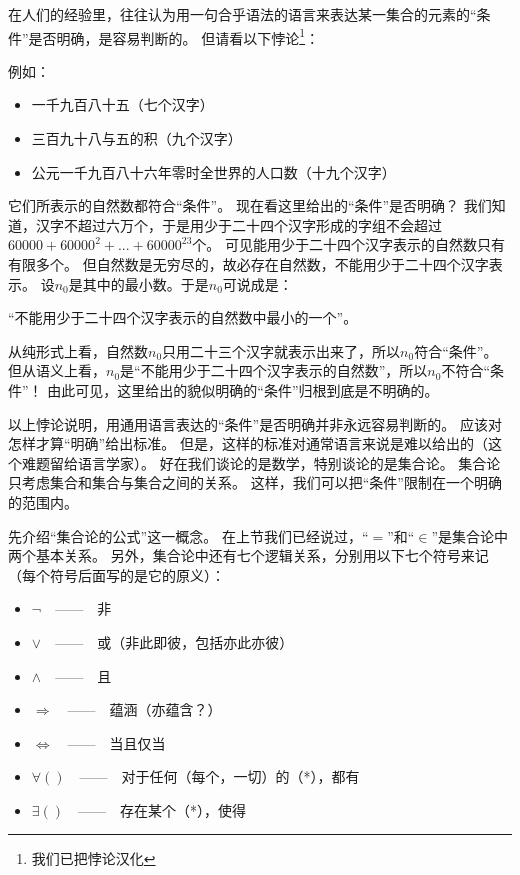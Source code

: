 在人们的经验里，往往认为用一句合乎语法的语言来表达某一集合的元素的“条件”是否明确，是容易判断的。
但请看以下悖论\footnote{我们已把悖论汉化}：


例如：
\begin{itemize}[label=$\circ$]
\item 一千九百八十五（七个汉字）
\item 三百九十八与五的积（九个汉字）
\item 公元一千九百八十六年零时全世界的人口数（十九个汉字）
\end{itemize}

\noindent 它们所表示的自然数都符合“条件”。
现在看这里给出的“条件”是否明确？
我们知道，汉字不超过六万个，于是用少于二十四个汉字形成的字组不会超过$60000+60000^{2} +...+60000^{23}$个。
可见能用少于二十四个汉字表示的自然数只有有限多个。
但自然数是无穷尽的，故必存在自然数，不能用少于二十四个汉字表示。
设$n_{0}$是其中的最小数。于是$n_{0}$可说成是：
\begin{center}
“不能用少于二十四个汉字表示的自然数中最小的一个”。
\end{center}
\noindent 从纯形式上看，自然数$n_{0}$只用二十三个汉字就表示出来了，所以$n_{0}$符合“条件”。
但从语义上看，$n_{0}$是“不能用少于二十四个汉字表示的自然数”，所以$n_{0}$不符合“条件”！
由此可见，这里给出的貌似明确的“条件”归根到底是不明确的。

以上悖论说明，用通用语言表达的“条件”是否明确并非永远容易判断的。
应该对怎样才算“明确”给出标准。
但是，这样的标准对通常语言来说是难以给出的（这个难题留给语言学家）。
好在我们谈论的是数学，特别谈论的是集合论。
集合论只考虑集合和集合与集合之间的关系。
这样，我们可以把“条件”限制在一个明确的范围内。

先介绍“集合论的公式”这一概念。
在上节我们已经说过，“$=$”和“$\in$”是集合论中两个基本关系。
另外，集合论中还有七个逻辑关系，分别用以下七个符号来记（每个符号后面写的是它的原义）：
\begin{itemize}[label=$\circ$]
\item $\neg$$\quad$——$\quad$非
\item $\lor$$\quad$——$\quad$或（非此即彼，包括亦此亦彼）
\item $\land$$\quad$——$\quad$且
\item $\Rightarrow$$\quad$——$\quad$蕴涵（亦蕴含？）
\item $\Leftrightarrow$$\quad$——$\quad$当且仅当
\item $\forall()$$\quad$——$\quad$对于任何（每个，一切）的（*），都有
\item $\exists()$$\quad$——$\quad$存在某个（*），使得
\end{itemize}

